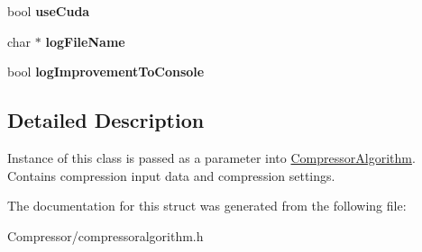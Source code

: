 \begin{DoxyCompactItemize}
\item 
bool {\bfseries use\+Cuda}\hypertarget{structlossycompressor_1_1_compressor_algorithm_1_1_args_a5a8adf1ba42897d697154018e370dd02}{}\label{structlossycompressor_1_1_compressor_algorithm_1_1_args_a5a8adf1ba42897d697154018e370dd02}

\item 
char $\ast$ {\bfseries log\+File\+Name}\hypertarget{structlossycompressor_1_1_compressor_algorithm_1_1_args_a4b726d4577b81acc243a6413e1337a98}{}\label{structlossycompressor_1_1_compressor_algorithm_1_1_args_a4b726d4577b81acc243a6413e1337a98}

\item 
bool {\bfseries log\+Improvement\+To\+Console}\hypertarget{structlossycompressor_1_1_compressor_algorithm_1_1_args_a080a52b14d1fbc31d5fa35890fad5014}{}\label{structlossycompressor_1_1_compressor_algorithm_1_1_args_a080a52b14d1fbc31d5fa35890fad5014}

\end{DoxyCompactItemize}


\subsection{Detailed Description}
Instance of this class is passed as a parameter into \hyperlink{classlossycompressor_1_1_compressor_algorithm}{Compressor\+Algorithm}. Contains compression input data and compression settings. 

The documentation for this struct was generated from the following file\+:\begin{DoxyCompactItemize}
\item 
Compressor/compressoralgorithm.\+h\end{DoxyCompactItemize}
